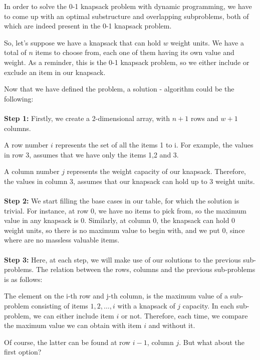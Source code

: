 \documentclass[12pt]{article}
\begin{document}
In order to solve the 0-1 knapsack problem with dynamic programming, we have to come up with an optimal substructure and overlapping subproblems, both of which are indeed present in the 0-1 knapsack problem. \par
So, let's suppose we have a knapsack that can hold $w$ weight units. We have a total of $n$ items to choose from, each one of them having its own value and weight. As a reminder, this is the 0-1 knapsack problem, so we either include or exclude an item in our knapsack. \par
Now that we have defined the problem, a solution - algorithm could be the following: \\ \\
\textbf{Step 1:} Firstly, we create a 2-dimensional array, with $n+1$ rows and $w+1$ columns. \par
A row number $i$ represents the set of all the items 1 to i. For example, the values in row 3, assumes that we have only the items 1,2 and 3. \par
A column number $j$ represents the weight capacity of our knapsack. Therefore, the values in column 3, assumes that our knapsack can hold up to 3 weight units. \\ \\
\textbf{Step 2:} We start filling the base cases in our table, for which the solution is trivial. For instance, at row 0, we have no items to pick from, so the maximum value in any knapsack is 0. Similarly, at column 0, the knapsack can hold 0 weight units, so there is no maximum value to begin with, and we put 0, since where are no massless valuable items. \\ \\
\textbf{Step 3:} Here, at each step, we will make use of our solutions to the previous sub-problems. The relation between the rows, columns and the previous sub-problems is as follows:  \par
The element on the i-th row and j-th column, is the maximum value of a sub-problem consisting of items $1,2,\ldots,i$ with a knapsack of $j$ capacity. In each sub-problem, we can either include item $i$ or not. Therefore, each time, we compare the maximum value we can obtain with item $i$ and without it. \par
Of course, the latter can be found at row $i-1$, column $j$. But what about the first option? \par
\end{document}
